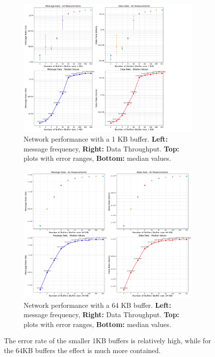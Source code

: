 \begin{figure}[htbp]
\centering
\begin{subfigure}[b]{0.85\textwidth}
    \centering
    \includegraphics[width=\textwidth]{images/results/libfabric_throughput_analysis_1K.png}
    \caption[Network performance with a 1 KB buffer]{Network performance with a 1 KB buffer. \textbf{Left:} message frequency, \textbf{Right:} Data Throughput. \textbf{Top:} plots with error ranges, \textbf{Bottom:} median values.}
    \label{fig:1kb-buffer-throughput}
\end{subfigure}
\vspace{0.2cm}
\begin{subfigure}[b]{0.85\textwidth}
    \centering
    \includegraphics[width=\textwidth]{images/results/libfabric_throughput_analysis_64K.png}
    \caption[Network performance with a 64 KB buffer]{Network performance with a 64 KB buffer. \textbf{Left:} message frequency, \textbf{Right:} Data Throughput. \textbf{Top:} plots with error ranges, \textbf{Bottom:} median values.}
    \label{fig:64kb-buffer-throughput}
\end{subfigure}
\caption[Throughput comparison of 1KB and 64KB buffer]{The error rate of the smaller 1KB buffers is relatively high, while for the 64KB buffers the effect is much more contained.}
\label{fig:throughput-of-the-extremes-1K-64K}
\end{figure}


